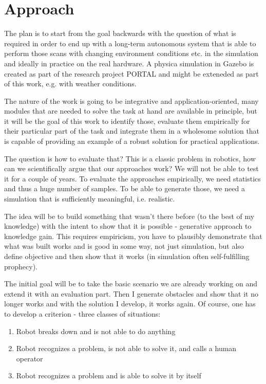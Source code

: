 \documentclass[german, master, expose, latin1]{base/thesis_KBS}
\begin{document}
\section{Approach}

The plan is to start from the goal backwards with the question of what is required in order to end up with a long-term autonomous system that is
able to perform those scans with changing environment conditions etc. in the simulation and ideally in practice on the real hardware.
A physica simulation in Gazebo is created as part of the research project PORTAL and might be exteneded as part of this work, e.g. with weather conditions.\newline

The nature of the work is going to be integrative and application-oriented, many modules that are needed to solve the task at hand are available in principle, 
but it will be the goal of this work to identify those, evaluate them empirically for their particular part of the task and integrate them in a wholesome 
solution that is capable of providing an example of a robust solution for practical applications.\newline

The question is how to evaluate that? This is a classic problem in robotics, how can we scientifically argue that our approaches work? 
We will not be able to test it for a couple of years.
To evaluate the approaches empirically, we need statistics and thus a huge number of samples. To be able to generate those, we need a simulation
that is sufficiently meaningful, i.e. realistic.\newline

The idea will be to build something that wasn't there before (to the best of my knowledge) with the intent to show that it is possible - generative approach to knowledge gain.
This requires empiricism, you have to plausibly demonstrate that what was built works and is good in some way, not just simulation, but also define objective and then 
show that it works (in simulation often self-fulfilling prophecy).\newline

The initial goal will be to take the basic scenario we are already working on and extend it with an evaluation part. Then I generate obstacles and show that it no
longer works and with the solution I develop, it works again. Of course, one has to develop a criterion - three classes of situations:
\begin{enumerate}
    \item Robot breaks down and is not able to do anything
    \item Robot recognizes a problem, is not able to solve it, and calls a human operator
    \item Robot recognizes a problem and is able to solve it by itself
\end{enumerate}
\end{document}
